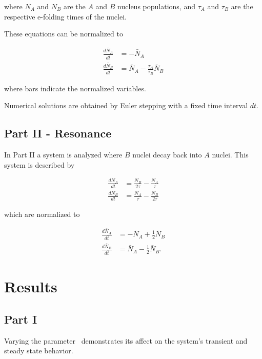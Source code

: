 \documentclass[pra,twocolumn,showpacs,amsmath,amssymb]{revtex4-1}
\begin{document}
where $N_A$ and $N_B$ are the $A$ and $B$ nucleus populations, and $\tau_A$ and
$\tau_B$ are the respective e-folding times of the nuclei.

These equations can be normalized to

\begin{align}
  \frac{d \bar N_A}{d \bar t} &= - \bar N_A \label{eq:decay_A_norm}\\
  \frac{d \bar N_B}{d \bar t} &= \bar N_A - \frac{\tau_A}{\tau_B} \label{eq:decay_B_norm}\bar N_B
\end{align}

where bars indicate the normalized variables.

Numerical solutions are obtained by Euler stepping with a fixed time interval $dt$.

\subsection{Part II - Resonance}

In Part II a system is analyzed where $B$ nuclei decay back into $A$ nuclei.
This system is described by

\begin{align}
  \frac{d N_A}{dt} &= \frac{N_B}{2 \tau} - \frac{N_A}{\tau} \\
  \frac{d N_B}{dt} &= \frac{N_A}{\tau} - \frac{N_B}{2 \tau}
\end{align}

which are normalized to

\begin{align}
  \frac{d \bar N_A}{d \bar t} &= -  \bar N_A + \frac{1}{2} \bar N_B \label{eq:res_A_norm} \\
  \frac{d \bar N_B}{d \bar t} &=  \bar N_A - \frac{1}{2} \bar N_B \label{eq:res_B_norm}.
\end{align}





\section{Results}

\subsection{Part I}

Varying the parameter \trel~demonstrates its affect on the
system's transient and steady state behavior.
\end{document}
